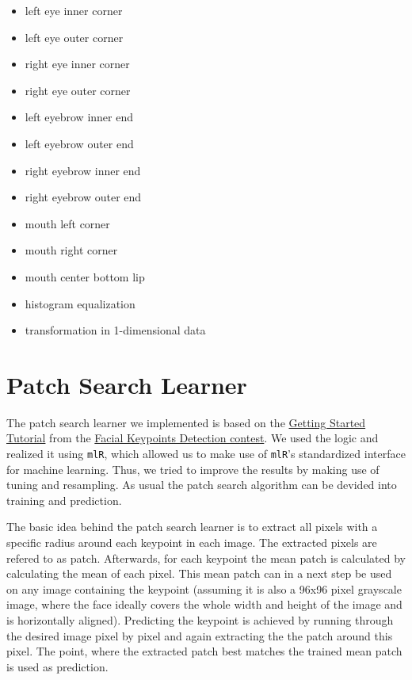 \documentclass[]{article}
\begin{document}
\begin{itemize}
\item
  left eye inner corner
\item
  left eye outer corner
\item
  right eye inner corner
\item
  right eye outer corner
\item
  left eyebrow inner end
\item
  left eyebrow outer end
\item
  right eyebrow inner end
\item
  right eyebrow outer end
\item
  mouth left corner
\item
  mouth right corner
\item
  mouth center bottom lip
\item
  histogram equalization
\item
  transformation in 1-dimensional data
\end{itemize}

\section{Patch Search Learner}\label{patch-search-learner}

The patch search learner we implemented is based on the
\href{https://www.kaggle.com/c/facial-keypoints-detection/details/getting-started-with-r}{Getting
Started Tutorial} from the
\href{https://www.kaggle.com/c/facial-keypoints-detection}{Facial
Keypoints Detection contest}. We used the logic and realized it using
\texttt{mlR}, which allowed us to make use of \texttt{mlR}'s
standardized interface for machine learning. Thus, we tried to improve
the results by making use of tuning and resampling. As usual the patch
search algorithm can be devided into training and prediction.

The basic idea behind the patch search learner is to extract all pixels
with a specific radius around each keypoint in each image. The extracted
pixels are refered to as patch. Afterwards, for each keypoint the mean
patch is calculated by calculating the mean of each pixel. This mean
patch can in a next step be used on any image containing the keypoint
(assuming it is also a 96x96 pixel grayscale image, where the face
ideally covers the whole width and height of the image and is
horizontally aligned). Predicting the keypoint is achieved by running
through the desired image pixel by pixel and again extracting the the
patch around this pixel. The point, where the extracted patch best
matches the trained mean patch is used as prediction.
\end{document}
